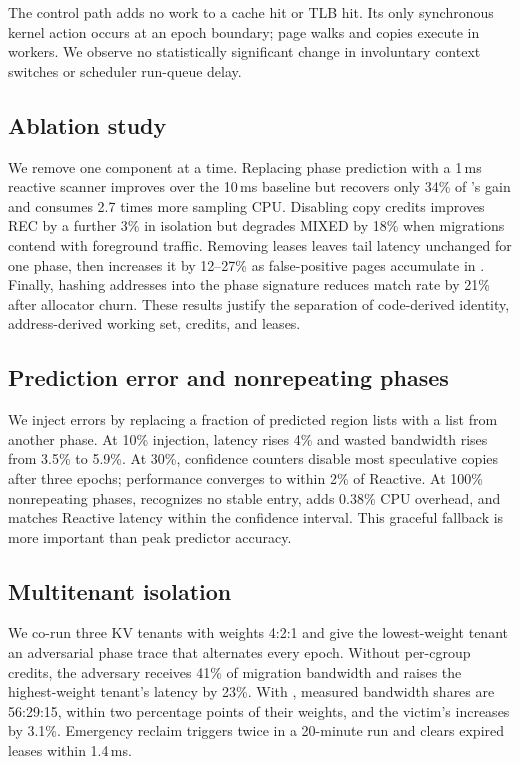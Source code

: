 The control path adds no work to a cache hit or TLB hit.  Its only synchronous
kernel action occurs at an epoch boundary; page walks and copies execute in
workers.  We observe no statistically significant change in involuntary
context switches or scheduler run-queue delay.

\subsection{Ablation study}

We remove one component at a time.  Replacing phase prediction with a 1\,ms
reactive scanner improves over the 10\,ms baseline but recovers only 34\% of
\system's \ptail gain and consumes 2.7 times more sampling CPU.  Disabling copy
credits improves REC by a further 3\% in isolation but degrades MIXED by 18\%
when migrations contend with foreground traffic.  Removing leases leaves tail
latency unchanged for one phase, then increases it by 12--27\% as false-positive
pages accumulate in \fast.  Finally, hashing addresses into the phase signature
reduces match rate by 21\% after allocator churn.  These results justify the
separation of code-derived identity, address-derived working set, credits, and
leases.

\subsection{Prediction error and nonrepeating phases}

We inject errors by replacing a fraction of predicted region lists with a list
from another phase.  At 10\% injection, \ptail latency rises 4\% and wasted bandwidth
rises from 3.5\% to 5.9\%.  At 30\%, confidence counters disable most speculative
copies after three epochs; performance converges to within 2\% of Reactive.
At 100\% nonrepeating phases, \system recognizes no stable entry, adds 0.38\%
CPU overhead, and matches Reactive latency within the confidence interval.
This graceful fallback is more important than peak predictor accuracy.

\subsection{Multitenant isolation}

We co-run three KV tenants with weights 4:2:1 and give the lowest-weight tenant
an adversarial phase trace that alternates every epoch.  Without per-cgroup
credits, the adversary receives 41\% of migration bandwidth and raises the
highest-weight tenant's \ptail latency by 23\%.  With \system, measured bandwidth
shares are 56:29:15, within two percentage points of their weights, and the
victim's \ptail increases by 3.1\%.  Emergency reclaim triggers twice in a
20-minute run and clears expired leases within 1.4\,ms.
